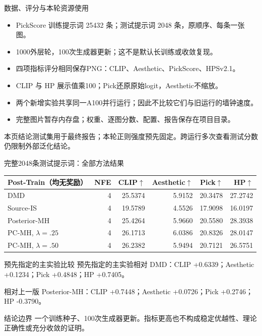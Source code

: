 \documentclass[10pt,aspectratio=169]{beamer}
\newcommand{\takeaway}[1]{\begin{exampleblock}{本页结论}\small #1\end{exampleblock}}
\begin{document}
\begin{frame}{数据、评分与本轮资源使用}
\small
\begin{itemize}\itemsep5pt
\item PickScore 训练提示词 25432 条；测试提示词 2048 条，原顺序、每条一张图。
\item 1000外层轮，100次生成器更新；这不是默认长训练或收敛复现。
\item 四项指标评分\alert{相同保存PNG}：CLIP、Aesthetic、PickScore、HPSv2.1。
\item CLIP 与 HP 展示值乘100；Pick还原原始logit，Aesthetic不缩放。
\item 两个新增实验共享同一A100并行运行；因此不比较它们与旧运行的墙钟速度。
\item 完整图片暂存内存盘；权重、逐图分数、配置、报告保存在项目目录。
\end{itemize}
\takeaway{测试集用于最终报告；本轮正则强度预先固定。跨运行多次查看测试分数仍限制外部泛化结论。}
\end{frame}

\begin{frame}{完整2048条测试提示词：全部方法结果}
\small
\begin{center}
\setlength{\tabcolsep}{4pt}
\begin{tabular}{lrrrrr}\toprule
Post-Train（均无奖励） & NFE & CLIP$\uparrow$ & Aesthetic$\uparrow$ & Pick$\uparrow$ & HP$\uparrow$\\\midrule
DMD & 4 & 25.5374 & 5.9152 & 20.3478 & 27.2742 \\
Source-IS & 4 & 19.5789 & 4.5526 & 17.9098 & 16.0197 \\
Posterior-MH & 4 & 25.4264 & 5.9660 & 20.5580 & 28.3938 \\
PC-MH, $\lambda=.25$ & 4 & 26.1713 & 6.0386 & 20.8326 & 28.0147 \\
PC-MH, $\lambda=.50$ & 4 & 26.2382 & 5.9494 & 20.7121 & 26.5751 \\
\bottomrule
\end{tabular}
\end{center}
\begin{block}{预先指定的主实验比较}
预先指定的主实验相对 DMD：CLIP +0.6339；Aesthetic +0.1234；Pick +0.4848；HP +0.7405。\par 相对上一版 Posterior-MH：CLIP +0.7448；Aesthetic +0.0726；Pick +0.2746；HP -0.3790。
\end{block}
\begin{alertblock}{结论边界}
一个训练种子、100次生成器更新。指标更高也不构成稳定优越性、理论正确性或充分收敛的证明。
\end{alertblock}
\end{frame}
\end{document}
